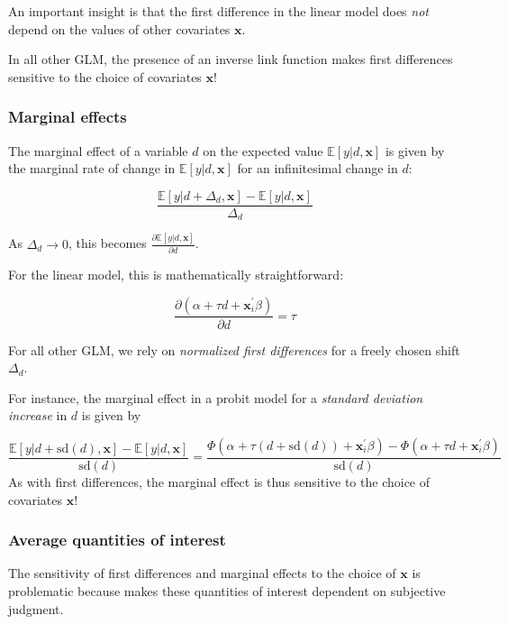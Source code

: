 \documentclass[
  11pt,
]{article}
\begin{document}
An important insight is that the first difference in the linear model does \emph{not} depend on the values of other covariates \(\mathbf{x}\).

In all other GLM, the presence of an inverse link function makes first differences sensitive to the choice of covariates \(\mathbf{x}\)!

\hypertarget{marginal-effects}{%
\subsubsection{Marginal effects}\label{marginal-effects}}

The marginal effect of a variable \(d\) on the expected value \(\mathbb{E}[y|d, \mathbf{x}]\) is given by the marginal rate of change in \(\mathbb{E}[y|d, \mathbf{x}]\) for an infinitesimal change in \(d\):

\[\frac{\mathbb{E}[y|d + \Delta_d, \mathbf{x}] - \mathbb{E}[y|d, \mathbf{x}]}{\Delta_d}\]

As \(\Delta_d \rightarrow 0\), this becomes \(\frac{\partial \mathbb{E}[y|d, \mathbf{x}]}{\partial d}\).

For the linear model, this is mathematically straightforward:

\[\frac{\partial (\alpha + \tau d + \mathbf{x}_i^{\prime} \beta)}{\partial d} = \tau\]

For all other GLM, we rely on \emph{normalized first differences} for a freely chosen shift \(\Delta_d\).

For instance, the marginal effect in a probit model for a \emph{standard deviation increase} in \(d\) is given by

\[\frac{\mathbb{E}[y|d + \text{sd}(d), \mathbf{x}] - \mathbb{E}[y|d, \mathbf{x}]}{\text{sd}(d)} = \frac{\Phi(\alpha + \tau (d + \text{sd}(d)) + \mathbf{x}_i^{\prime} \beta) - \Phi(\alpha + \tau d + \mathbf{x}_i^{\prime} \beta)}{\text{sd}(d)}\]
As with first differences, the marginal effect is thus sensitive to the choice of covariates \(\mathbf{x}\)!

\hypertarget{average-quantities-of-interest}{%
\subsubsection{Average quantities of interest}\label{average-quantities-of-interest}}

The sensitivity of first differences and marginal effects to the choice of \(\mathbf{x}\) is problematic because makes these quantities of interest dependent on subjective judgment.
\end{document}
